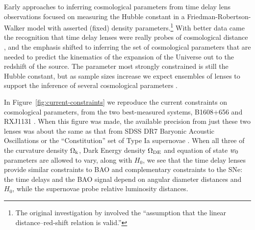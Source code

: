 Early approaches to inferring cosmological parameters from time delay
lens observations focused on measuring the Hubble constant in a
Friedman-Robertson-Walker model with asserted (fixed) density
parameters.\footnote{The original investigation by \citet{Ref64}
involved the ``assumption that the linear distance--red-shift relation
is valid.''} With better data came the recognition that time delay
lenses were really probes of cosmological distance
\citep{Koo++03,Suy++10}, and the emphasis shifted to
inferring the set of cosmological parameters that are needed to predict
the kinematics of the expansion of the Universe out to the redshift of
the source.
The parameter most strongly constrained is still the Hubble constant,
but as sample sizes increase we expect ensembles of lenses to support
the inference of several cosmological parameters \citep[or combinations
thereof][]{LewisAndIbata2002}.

In Figure~\ref{fig:current-constraints} we reproduce the current
constraints on cosmological parameters, from the two best-measured
systems, B1608$+$656 and RXJ1131 \citep{Suy++14}. When this figure was
made, the available precision from just these two lenses was about the
same as that from SDSS DR7 Baryonic Acoustic Oscillations
\citep{PercivalEtal2010} or the ``Constitution'' set of Type Ia
supernovae \citep{HickenEtal2009}.  When all three of the curvature
density $\Omega_{\rm k}$, Dark Energy density $\Omega_{\rm DE}$ and equation of state $w_0$
parameters are allowed to vary, along with $H_0$, we see that the time
delay lenses provide similar constraints to BAO and complementary
constraints to the SNe: the time delays and the BAO signal depend on
angular diameter distances and $H_0$, while the supernovae probe
relative luminosity distances.

